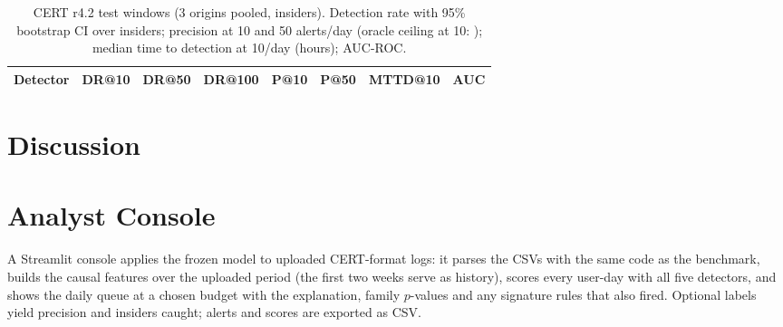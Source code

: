 \documentclass[conference]{IEEEtran}
\begin{document}
\begin{table}[t]
\centering
\caption{CERT r4.2 test windows (3 origins pooled, \NInsTest{} insiders). Detection rate with 95\%
bootstrap CI over insiders; precision at 10 and 50 alerts/day (oracle ceiling at 10: \OracleP);
median time to detection at 10/day (hours); AUC-ROC.}
\label{tab:main}
\begin{tabular}{lccccccc}
\toprule
Detector & DR@10 & DR@50 & DR@100 & P@10 & P@50 & MTTD@10 & AUC \\
\midrule

\bottomrule
\end{tabular}
\end{table}

\begin{table}[t]
\centering
\caption{Pre-registered hypotheses vs.\ Isolation Forest at 10 alerts/day (supported only if the
whole 95\% interval clears the threshold).}
\label{tab:hyp}
\end{table}



\section{Discussion}


\section{Analyst Console}
A Streamlit console applies the frozen model to uploaded CERT-format logs: it parses the CSVs with
the same code as the benchmark, builds the causal features over the uploaded period (the first two
weeks serve as history), scores every user-day with all five detectors, and shows the daily queue
at a chosen budget with the explanation, family $p$-values and any signature rules that also fired.
Optional labels yield precision and insiders caught; alerts and scores are exported as CSV.

\end{document}
